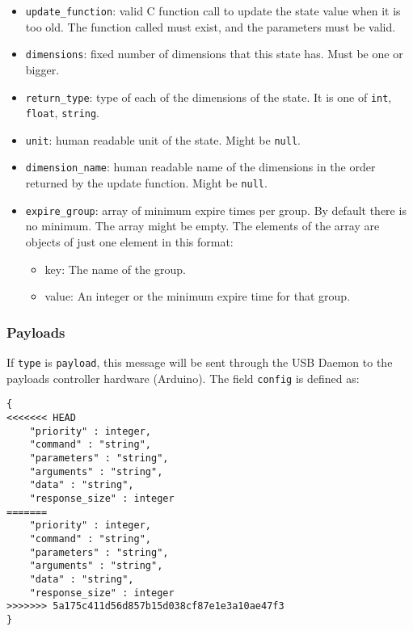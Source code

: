 \documentclass[12pt,a4paper]{report}
\begin{document}
\begin{itemize}
\item \texttt{update\_function}: valid C function call to update the state value when it is too old. The function called must exist, and the parameters must be valid.
\item \texttt{dimensions}: fixed number of dimensions that this state has. Must be one or bigger.
\item \texttt{return\_type}: type of each of the dimensions of the state. It is one of \texttt{int}, \texttt{float}, \texttt{string}.
\item \texttt{unit}: human readable unit of the state. Might be \texttt{null}.
\item \texttt{dimension\_name}: human readable name of the dimensions in the order returned by the update function. Might be \texttt{null}.
\item \texttt{expire\_group}: array of minimum expire times per group. By default there is no minimum. The array might be empty. The elements of the array are objects of just one element in this format:
\begin{itemize}
\item key: The name of the group.
\item value: An integer or the minimum expire time for that group.
\end{itemize}
\end{itemize}

\subsubsection*{Payloads}
If \texttt{type} is \texttt{payload}, this message will be sent through the USB Daemon to the payloads controller hardware (Arduino). The field \texttt{config} is defined as:
\begin{lstlisting}
{
<<<<<<< HEAD
    "priority" : integer,
    "command" : "string",
    "parameters" : "string",
    "arguments" : "string",
    "data" : "string",
    "response_size" : integer
=======
	"priority" : integer,
	"command" : "string",
	"parameters" : "string",
	"arguments" : "string",
	"data" : "string",
	"response_size" : integer
>>>>>>> 5a175c411d56d857b15d038cf87e1e3a10ae47f3
}
\end{lstlisting}
\end{document}
